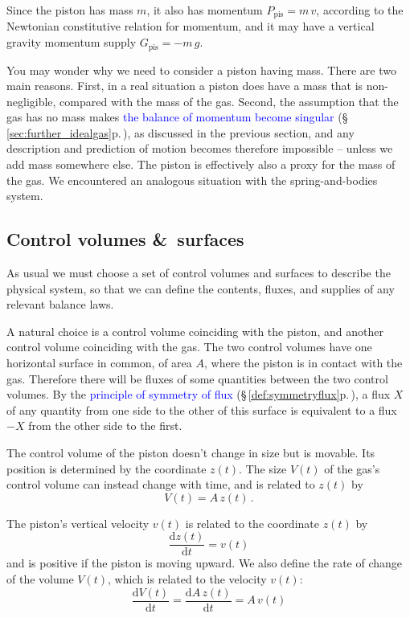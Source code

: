 \documentclass[a4paper,12pt,%
onecolumn,oneside,%
british%
]{memoir}
\newcommand*{\amp}{\&}
\newcommand*{\di}{\mathrm{d}}%
\renewcommand*{\|}[1][]{\nonscript\:#1\vert\nonscript\:\mathopen{}}
\newcommand*{\sect}{\S}%
\renewcommand*{\autoref}[3][\sect\,\ref]{\textcolor{blue}{#3} {\color{blue}\scriptsize(\faIcon[regular]{eye}\;#1{#2}\;p.\,\pageref{#2})}}
\newcommand*{\dt}{\di t}
\newcommand*{\ym}{m}%
\newcommand*{\yPpi}{P_{\textrm{pis}}}
\newcommand*{\yGpi}{G_{\textrm{pis}}}
\begin{document}
Since the piston has mass $\ym$, it also has momentum $\yPpi=\ym\,v$, according to the Newtonian constitutive relation for momentum, and it may have a vertical gravity momentum supply $\yGpi = -\ym\,g$.

You may wonder why we need to consider a piston having mass. There are two main reasons. First, in a real situation a piston does have a mass that is non-negligible, compared with the mass of the gas. Second, the assumption that the gas has no mass makes \autoref{sec:further_idealgas}{the balance of momentum become singular}, as discussed in the previous section, and any description and prediction of motion becomes therefore impossible -- unless we add mass somewhere else. The piston is effectively also a proxy for the mass of the gas. We encountered an analogous situation with the spring-and-bodies system.

\subsection{Control volumes \amp\ surfaces}
\label{sec:idealgas_ex_control}

As usual we must choose a set of control volumes and surfaces to describe the physical system, so that we can define the contents, fluxes, and supplies of any relevant balance laws.

A natural choice is a control volume coinciding with the piston, and another control volume coinciding with the gas. The two control volumes have one horizontal surface in common, of area $A$, where the piston is in contact with the gas. Therefore there will be fluxes of some quantities between the two control volumes. By the \autoref{def:symmetryflux}{principle of symmetry of flux}, a flux $X$ of any quantity from one side to the other of this surface is equivalent to a flux $-X$ from the other side to the first.

The control volume of the piston doesn't change in size but is movable. Its position is determined by the coordinate $z(t)$. The size $V(t)$ of the gas's control volume can instead change with time, and is related to $z(t)$ by
\begin{equation}\label{eq:Vz_gas}
  V(t) = A\,z(t) \,.
\end{equation}

The piston's vertical velocity $v(t)$ is related to the coordinate $z(t)$ by
\begin{equation*}
  \frac{\di z(t)}{\dt} = v(t)
\end{equation*}
and is positive if the piston is moving upward. We also define the rate of change of the volume $V(t)$, which is related to the velocity $v(t)$:
\begin{equation}\label{eq:Vv_gas}
  \frac{\di V(t)}{\dt} = \frac{\di A\, z(t)}{\dt} = A\,v(t)
\end{equation}
\end{document}
